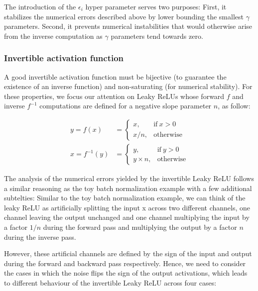 \documentclass[twocolumn]{bmcart}
\begin{document}
The introduction of the $\epsilon_i$ hyper parameter serves two purposes: 
First, it stabilizes the numerical errors described above by lower bounding the smallest $\gamma$ parameters. 
Second, it prevents numerical instabilities that would otherwise arise from the inverse computation as $\gamma$ parameters tend towards zero. 

\subsubsection{Invertible activation function}

A good invertible activation function must be bijective (to guarantee the existence of an inverse function) and non-saturating (for numerical stability).
For these properties, we focus our attention on Leaky ReLUs whose forward $f$ and inverse $f^{-1}$ computations are defined for a negative slope parameter $n$, as follow:

\begin{subequations}
\begin{align}
y = f(x) &=      \begin{cases}
x, & \text{if}\ x>0 \\
x / n, & \text{otherwise}
\end{cases} \\
x = f^{-1}(y) &= \begin{cases}
y, & \text{if}\ y>0 \\
y \times n, & \text{otherwise}
\end{cases} 
\end{align}
\end{subequations}

The analysis of the numerical errors yielded by the invertible Leaky ReLU follows a similar reasoning as the toy batch normalization example with a few additional subtelties:
Similar to the toy batch normalization example, we can think of the leaky ReLU as artificially splitting the input x across two different channels, one channel leaving the output unchanged and one channel multiplying the input by a factor $1/n$ during the forward pass and multiplying the output by a factor $n$ during the inverse pass.

However, these artificial channels are defined by the sign of the input and output during the forward and backward pass respectively.
Hence, we need to consider the cases in which the noise flips the sign of the output activations, 
which leads to different behaviour of the invertible Leaky ReLU across four cases: 
\end{document}
